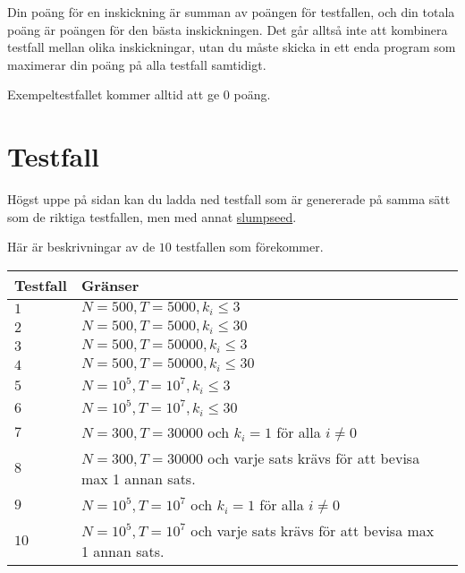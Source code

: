 Din poäng för en inskickning är summan av poängen för testfallen, och din totala poäng är poängen för den bästa inskickningen.
Det går alltså inte att kombinera testfall mellan olika inskickningar, utan du måste skicka in ett enda program som
maximerar din poäng på alla testfall samtidigt.

Exempeltestfallet kommer alltid att ge $0$ poäng.

\section*{Testfall}
Högst uppe på sidan kan du ladda ned testfall som är genererade på samma sätt som de riktiga testfallen,
men med annat \href{https://en.wikipedia.org/wiki/Random_seed}{slumpseed}.

Här är beskrivningar av de $10$ testfallen som förekommer.

\noindent
\begin{tabular}{| l | l | l |}
\hline
Testfall & Gränser  \\ \hline
$1$       & $N=500,T=5000,k_i \le 3$  \\ \hline
$2$       & $N=500,T=5000,k_i \le 30$  \\ \hline
$3$       & $N=500,T=50000,k_i \le 3$  \\ \hline
$4$       & $N=500,T=50000,k_i \le 30$  \\ \hline
$5$       & $N=10^5,T=10^7,k_i \le 3$  \\ \hline
$6$       & $N=10^5,T=10^7,k_i \le 30$  \\ \hline
$7$       & $N=300,T=30000$ och $k_i=1$ för alla $i\neq0$\\ \hline
$8$       & $N=300,T=30000$ och varje sats krävs för att bevisa max 1 annan sats. \\ \hline
$9$       & $N=10^5,T=10^7$ och $k_i=1$ för alla $i\neq0$ \\ \hline
$10$      & $N=10^5,T=10^7$ och varje sats krävs för att bevisa max 1 annan sats.  \\ \hline
\end{tabular}
